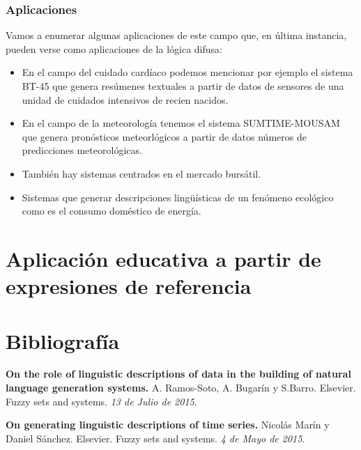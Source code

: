 \documentclass[10pt,a4paper]{article}
\begin{document}
\subsubsection{Aplicaciones}

Vamos a enumerar algunas aplicaciones de este campo que, en última instancia, pueden verse como aplicaciones de la lógica difusa:

\begin{itemize}
\item En el campo del cuidado cardíaco podemos mencionar por ejemplo el sistema BT-45 que genera resúmenes textuales a partir de datos de sensores de una unidad de cuidados intensivos de recien nacidos.
\item En el campo de la meteorología tenemos el sistema SUMTIME-MOUSAM que genera pronósticos meteorlógicos a partir de datos números de predicciones meteorológicas.
\item También hay sistemas centrados en el mercado bursátil.
\item Sistemas que generar descripciones lingüísticas de un fenómeno ecológico como es el consumo doméstico de energía.
\end{itemize}

\section{Aplicación educativa a partir de expresiones de referencia}

\newpage

\section{Bibliografía}
\begin{enumerate}[{[}1{]}]
\item \textbf{On the role of linguistic descriptions of data in the building of natural language generation systems.} A. Ramos-Soto, A. Bugarín y S.Barro. Elsevier. Fuzzy sets and systems. \textit{13 de Julio de 2015}.
\item \textbf{On generating linguistic descriptions of time series.} Nicolás Marín y Daniel Sánchez. Elsevier. Fuzzy sets and systems. \textit{4 de Mayo de 2015}.
\end{enumerate}
\end{document}
